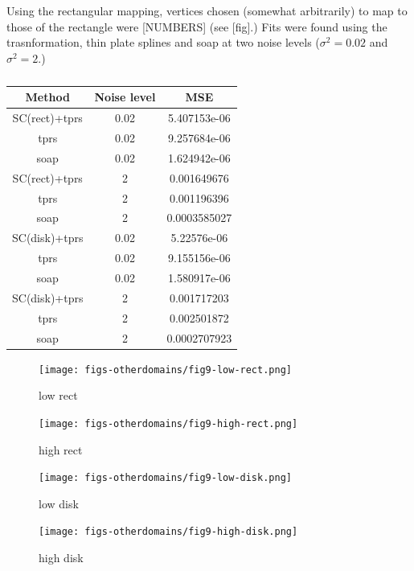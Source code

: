 \documentclass[a4paper,10pt]{amsart}
\begin{document}
Using the rectangular mapping, vertices chosen (somewhat arbitrarily) to map to those of the rectangle were [NUMBERS] (see [fig].) Fits were found using the trasnformation, thin plate splines and soap at two noise levels ($\sigma^2=0.02$ and $\sigma^2=2$.)

\begin{table}[ht]
\begin{tabular}{c c c}\\
Method & Noise level & MSE \\
\hline
\hline
SC(rect)+tprs & 0.02 & 5.407153e-06\\ 
tprs & 0.02 & 9.257684e-06\\
soap & 0.02 & 1.624942e-06\\
SC(rect)+tprs & 2 & 0.001649676\\
tprs & 2 & 0.001196396\\
soap & 2 & 0.0003585027\\
SC(disk)+tprs & 0.02 & 5.22576e-06\\ 
tprs & 0.02 & 9.155156e-06 \\
soap & 0.02 & 1.580917e-06 \\
SC(disk)+tprs & 2 & 0.001717203 \\
tprs & 2 & 0.002501872 \\
soap & 2 & 0.0002707923 \\
\end{tabular}
\caption{}
\label{}
\end{table}


\begin{figure}
\centering
\texttt{[image: figs-otherdomains/fig9-low-rect.png]} \\
\caption{low rect}
\label{fig9-low-rect}
\end{figure}

\begin{figure}
\centering
\texttt{[image: figs-otherdomains/fig9-high-rect.png]} \\
\caption{high rect}
\label{fig9-high-rect}
\end{figure}

\begin{figure}
\centering
\texttt{[image: figs-otherdomains/fig9-low-disk.png]} \\
\caption{low disk}
\label{fig9-low-disk}
\end{figure}

\begin{figure}
\centering
\texttt{[image: figs-otherdomains/fig9-high-disk.png]} \\
\caption{high disk}
\label{fig9-high-disk}
\end{figure}
\end{document}
